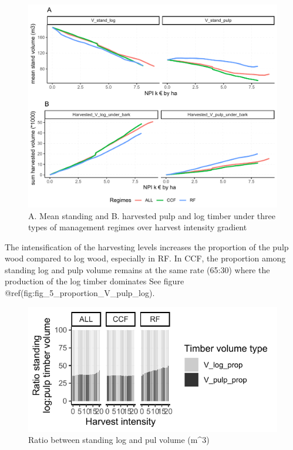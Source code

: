 \documentclass[]{elsarticle} %
\makeatletter
\def\maxwidth{\ifdim\Gin@nat@width>\linewidth\linewidth
\else\Gin@nat@width\fi}
\let\Oldincludegraphics\includegraphics
\renewcommand{\includegraphics}[1]{\Oldincludegraphics[width=\maxwidth]{#1}}
\makeatother
\begin{document}
\begin{figure}
\centering
\includegraphics{test_manus_files/figure-latex/fig_4_plot_V_timber-1.pdf}
\caption{A. Mean standing and B. harvested pulp and log timber under
three types of management regimes over harvest intensity gradient}
\end{figure}

The intensification of the harvesting levels increases the proportion of
the pulp wood compared to log wood, especially in RF. In CCF, the
proportion among standing log and pulp volume remains at the same rate
(65:30) where the production of the log timber dominates See figure
@ref(fig:fig\_5\_proportion\_V\_pulp\_log).

\begin{figure}
\centering
\includegraphics{test_manus_files/figure-latex/fig_5_proportion_V_pulp_log-1.pdf}
\caption{Ratio between standing log and pul volume (m\^{}3)}
\end{figure}
\end{document}
